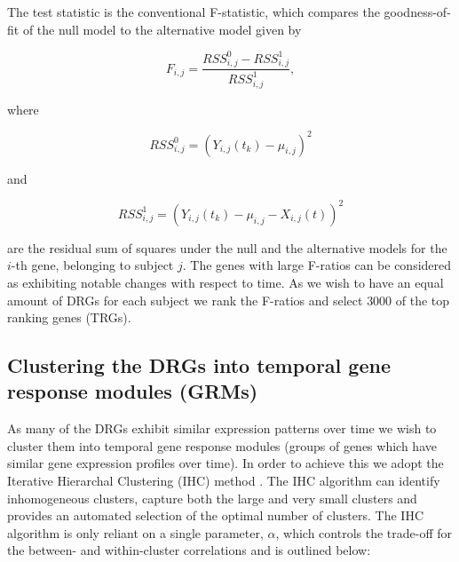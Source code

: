 The test statistic is the conventional F-statistic, which compares the goodness-of-fit of the null model to the alternative model given by

\begin{equation}
\label{eq:altmodel}
F_{i,j}=\frac{RSS_{i,j}^0-RSS_{i,j}^1}{RSS_{i,j}^1},
\end{equation}

where 

\begin{equation} 
RSS_{i,j}^0= (Y_{i,j}(t_{k}) -\mu_{i,j} )^{2}
\end{equation}

and

\begin{equation} RSS_{i,j}^1=(Y_{i,j}(t_{k}) -\mu_{i,j} - X_{i,j}(t))^{2} \end{equation}

are the residual sum of squares under the null and the alternative models for the $i$-th gene, belonging to subject $j$. The genes with large F-ratios can be considered as exhibiting notable changes with respect to time. As we wish to have an equal amount of DRGs for each subject we rank the F-ratios and select $3000$ of the top ranking genes (TRGs).

\subsection{Clustering the DRGs into temporal gene response modules (GRMs)}
\label{section:identification_of_grms}

As many of the DRGs exhibit similar expression patterns over time we wish to cluster them into temporal gene response modules (groups of genes which have similar gene expression profiles over time). In order to achieve this we adopt the Iterative Hierarchal Clustering (IHC) method \cite{careycluster}. The IHC algorithm can identify inhomogeneous clusters, capture both the large and very small clusters and provides an automated selection of the optimal number of clusters. The IHC algorithm is only reliant on a single parameter, $\alpha$, which controls the trade-off for the between- and within-cluster correlations and is outlined below:

